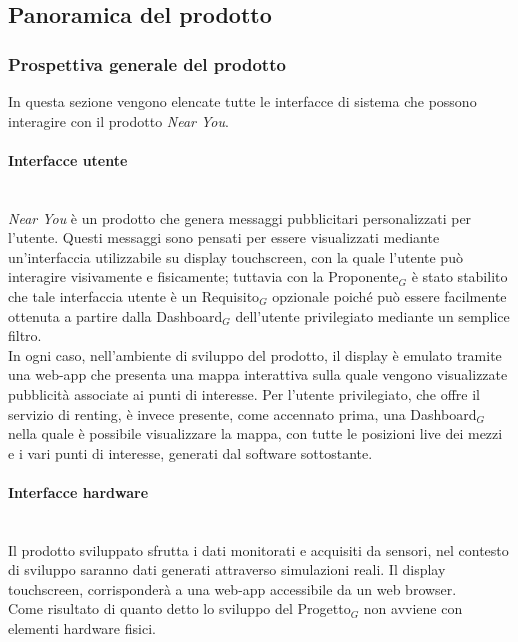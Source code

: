 \documentclass[11pt]{article}
\begin{document}
\begin{justify}
\subsection{Panoramica del prodotto}
\subsubsection{Prospettiva generale del prodotto} 
In questa sezione vengono elencate tutte le interfacce di sistema che possono interagire con il prodotto \textit{Near You}.

\paragraph{Interfacce utente}\mbox{}\\
\textit{Near You} è un prodotto che genera messaggi pubblicitari personalizzati per l'utente. Questi messaggi sono pensati per essere visualizzati mediante un'interfaccia utilizzabile su display touchscreen, con la quale l'utente può interagire visivamente e fisicamente; tuttavia con la Proponente$_G$ è stato stabilito che tale interfaccia utente 
è un Requisito$_G$ opzionale poiché può essere facilmente ottenuta a partire dalla Dashboard$_G$ dell'utente privilegiato mediante un semplice filtro.\\
In ogni caso, nell'ambiente di sviluppo del prodotto, il display è emulato tramite una web-app che presenta una mappa interattiva sulla quale vengono visualizzate pubblicità associate ai punti di interesse. Per l'utente 
privilegiato, che offre il servizio di renting, è invece presente, come accennato prima, una Dashboard$_G$ nella quale è possibile visualizzare la mappa, con tutte le posizioni live dei mezzi e i vari punti di interesse, 
generati dal software sottostante.

\paragraph{Interfacce hardware}\mbox{}\\
Il prodotto sviluppato sfrutta i dati monitorati e acquisiti da sensori, nel contesto di sviluppo saranno dati generati attraverso simulazioni reali. Il display touchscreen, corrisponderà a una web-app accessibile da un web browser.\\
Come risultato di quanto detto lo sviluppo del Progetto$_G$ non avviene con elementi hardware fisici.


\end{justify}
\end{document}
